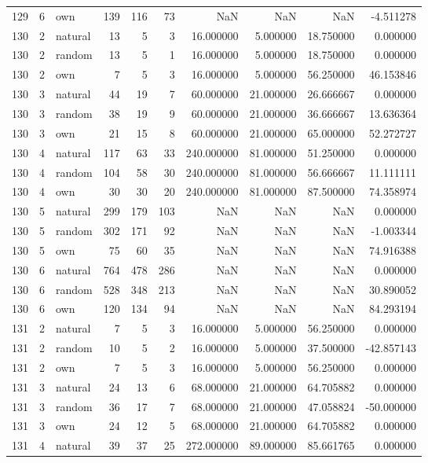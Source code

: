 \begin{table}[htbp]
\begin{tabular}{rrlrrrrrrr}
129 & 6 & own & 139 & 116 & 73 & NaN & NaN & NaN & -4.511278 \\
130 & 2 & natural & 13 & 5 & 3 & 16.000000 & 5.000000 & 18.750000 & 0.000000 \\
130 & 2 & random & 13 & 5 & 1 & 16.000000 & 5.000000 & 18.750000 & 0.000000 \\
130 & 2 & own & 7 & 5 & 3 & 16.000000 & 5.000000 & 56.250000 & 46.153846 \\
130 & 3 & natural & 44 & 19 & 7 & 60.000000 & 21.000000 & 26.666667 & 0.000000 \\
130 & 3 & random & 38 & 19 & 9 & 60.000000 & 21.000000 & 36.666667 & 13.636364 \\
130 & 3 & own & 21 & 15 & 8 & 60.000000 & 21.000000 & 65.000000 & 52.272727 \\
130 & 4 & natural & 117 & 63 & 33 & 240.000000 & 81.000000 & 51.250000 & 0.000000 \\
130 & 4 & random & 104 & 58 & 30 & 240.000000 & 81.000000 & 56.666667 & 11.111111 \\
130 & 4 & own & 30 & 30 & 20 & 240.000000 & 81.000000 & 87.500000 & 74.358974 \\
130 & 5 & natural & 299 & 179 & 103 & NaN & NaN & NaN & 0.000000 \\
130 & 5 & random & 302 & 171 & 92 & NaN & NaN & NaN & -1.003344 \\
130 & 5 & own & 75 & 60 & 35 & NaN & NaN & NaN & 74.916388 \\
130 & 6 & natural & 764 & 478 & 286 & NaN & NaN & NaN & 0.000000 \\
130 & 6 & random & 528 & 348 & 213 & NaN & NaN & NaN & 30.890052 \\
130 & 6 & own & 120 & 134 & 94 & NaN & NaN & NaN & 84.293194 \\
131 & 2 & natural & 7 & 5 & 3 & 16.000000 & 5.000000 & 56.250000 & 0.000000 \\
131 & 2 & random & 10 & 5 & 2 & 16.000000 & 5.000000 & 37.500000 & -42.857143 \\
131 & 2 & own & 7 & 5 & 3 & 16.000000 & 5.000000 & 56.250000 & 0.000000 \\
131 & 3 & natural & 24 & 13 & 6 & 68.000000 & 21.000000 & 64.705882 & 0.000000 \\
131 & 3 & random & 36 & 17 & 7 & 68.000000 & 21.000000 & 47.058824 & -50.000000 \\
131 & 3 & own & 24 & 12 & 5 & 68.000000 & 21.000000 & 64.705882 & 0.000000 \\
131 & 4 & natural & 39 & 37 & 25 & 272.000000 & 89.000000 & 85.661765 & 0.000000 \\

\end{tabular}
\end{table}
